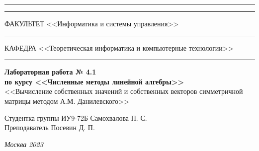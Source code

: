 \documentclass[a4paper, 14pt]{extarticle}
\begin{document}
\begin{titlepage}
\vspace{-25pt}
\hspace{-35pt}\rule{\textwidth}{2.3pt}

\vspace*{-20.3pt}
\hspace{-35pt}\rule{\textwidth}{0.4pt}

\vspace{1.5ex}
\hspace{-35pt} \noindent \small ФАКУЛЬТЕТ\hspace{80pt} <<Информатика и системы управления>>

\vspace*{-16pt}
\hspace{47pt}\rule{0.83\textwidth}{0.4pt}

\vspace{0.5ex}
\hspace{-35pt} \noindent \small КАФЕДРА\hspace{50pt} <<Теоретическая информатика и компьютерные технологии>>

\vspace*{-16pt}
\hspace{30pt}\rule{0.866\textwidth}{0.4pt}
  
\vspace{11em}

\begin{center}
\Large {\bf Лабораторная работа № 4.1} \\
\large {\bf по курсу <<Численные методы линейной алгебры>>} \\
\large <<Вычисление собственных значений и собственных
векторов симметричной матрицы методом А.М.
Данилевского>>
\end{center}\normalsize

\vspace{8em}


\begin{flushright}
  {Студентка группы ИУ9-72Б Самохвалова П. С. \hspace*{15pt}\\
  \vspace{2ex}
  Преподаватель Посевин Д. П.\hspace*{15pt}}
\end{flushright}

\bigskip

\vfill
 

\begin{center}
\textsl{Москва 2023}
\end{center}
\end{titlepage}
\end{document}
